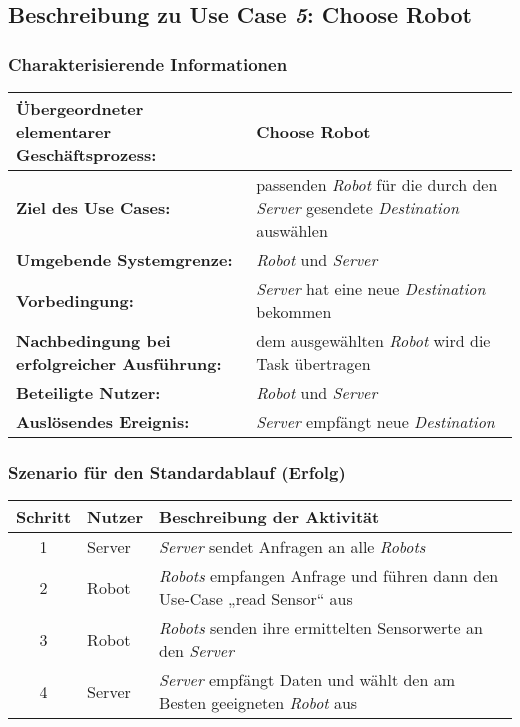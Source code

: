 			
		\pagebreak

		\subsection{Beschreibung zu Use Case \emph{5}: Choose Robot}

			\subsubsection*{Charakterisierende Informationen}

			\begin{table}[H]
				\centering
				\begin{tabularx}{\textwidth}{@{}p{5cm}X@{}}
				\hline
				\textbf{Übergeordneter elementarer Geschäftsprozess:} & Choose Robot \\ \hline
				\textbf{Ziel des Use Cases:} & passenden \emph{Robot} für die durch den \emph{Server} gesendete \emph{Destination} auswählen\\ \hline
				\textbf{Umgebende Systemgrenze:} & \emph{Robot} und \emph{Server} \\ \hline
				\textbf{Vorbedingung:} & \emph{Server} hat eine neue \emph{Destination} bekommen\\ \hline
				\textbf{Nachbedingung bei erfolgreicher Ausführung:} & dem ausgewählten \emph{Robot} wird die Task übertragen\\ \hline
				\textbf{Beteiligte Nutzer:} & \emph{Robot} und \emph{Server}\\ \hline
				\textbf{Auslösendes Ereignis:} & \emph{Server} empfängt neue \emph{Destination}\\
				\hline
				\end{tabularx}
			\end{table}

			\subsubsection*{Szenario für den Standardablauf (Erfolg)}

			\begin{table}[H]
				\centering
				\begin{tabularx}{\textwidth}{@{}cp{2cm}X@{}}
				\hline
				Schritt & Nutzer & Beschreibung der Aktivität \\ \hline
				1 & Server & \emph{Server} sendet Anfragen an alle \emph{Robots} \\
				2 & Robot & \emph{Robots} empfangen Anfrage und führen dann den Use-Case „read Sensor“ aus \\
				3 & Robot & \emph{Robots} senden ihre ermittelten Sensorwerte an den \emph{Server}\\
				4 & Server & \emph{Server} empfängt Daten und wählt den am Besten geeigneten \emph{Robot} aus \\
				\hline
				\end{tabularx}
			\end{table}

